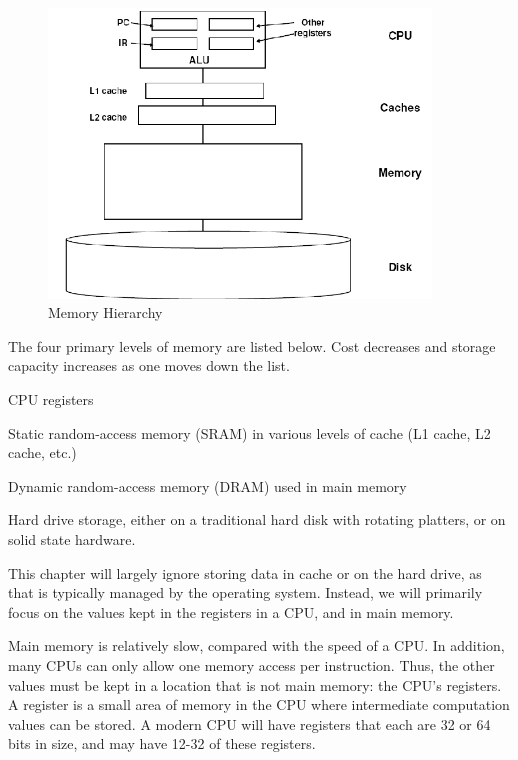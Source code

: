 \begin{figure}
\begin{center}
\includegraphics[width=4in]{ibcm/memory-hierarchy.png}
\end{center}
\caption{Memory Hierarchy}
\label{memory-hierarchy}
\vspace{-0.6in}
\end{figure}

The four primary levels of memory are listed below.  Cost decreases
and storage capacity increases as one moves down the list.

\begin{itemlist}
\item CPU registers
\item Static random-access memory (SRAM) in various levels of cache
  (L1 cache, L2 cache, etc.)
\item Dynamic random-access memory (DRAM) used in main memory
\item Hard drive storage, either on a traditional hard disk with
  rotating platters, or on solid state hardware.
\end{itemlist}

This chapter will largely ignore storing data in cache or on the hard
drive, as that is typically managed by the operating system.  Instead,
we will primarily focus on the values kept in the registers in a CPU,
and in main memory.

Main memory is relatively slow, compared with the speed of a CPU.  In
addition, many CPUs can only allow one memory access per instruction.
Thus, the other values must be kept in a location that is not main memory:
the CPU's registers.  A register is a small area of memory in the CPU
where intermediate computation values can be stored.  A modern CPU
will have registers that each are 32 or 64 bits in size, and may have
12-32 of these registers.

